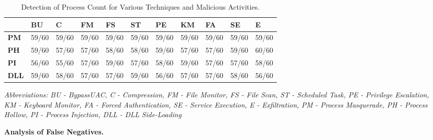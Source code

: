 \begin{table}[h!]
    \centering
    \begin{tabularx}{\textwidth}{|X|X|X|X|X|X|X|X|X|X|X|}
        \hline
        & \textbf{BU} & \textbf{C} & \textbf{FM} & \textbf{FS} & \textbf{ST} & \textbf{PE} & \textbf{KM} & \textbf{FA} & \textbf{SE} & \textbf{E} \\
        \hline
\multicolumn{1}{|l|}{\textbf{PM}} & \multicolumn{1}{l|}{59/60}   & \multicolumn{1}{l|}{59/60}  & \multicolumn{1}{l|}{59/60}   & \multicolumn{1}{l|}{59/60}   & \multicolumn{1}{l|}{59/60}   & \multicolumn{1}{l|}{59/60}   & \multicolumn{1}{l|}{59/60}   & \multicolumn{1}{l|}{59/60}   & \multicolumn{1}{l|}{59/60}   & \multicolumn{1}{l|}{59/60}  \\ \hline
\multicolumn{1}{|l|}{\textbf{PH}} & \multicolumn{1}{l|}{59/60}   & \multicolumn{1}{l|}{57/60}  & \multicolumn{1}{l|}{57/60}   & \multicolumn{1}{l|}{58/60}   & \multicolumn{1}{l|}{58/60}   & \multicolumn{1}{l|}{59/60}   & \multicolumn{1}{l|}{57/60}   & \multicolumn{1}{l|}{57/60}   & \multicolumn{1}{l|}{59/60}   & \multicolumn{1}{l|}{60/60}  \\ \hline
\multicolumn{1}{|l|}{\textbf{PI}} & \multicolumn{1}{l|}{56/60}   & \multicolumn{1}{l|}{55/60}  & \multicolumn{1}{l|}{57/60}   & \multicolumn{1}{l|}{59/60}   & \multicolumn{1}{l|}{57/60}   & \multicolumn{1}{l|}{58/60}   & \multicolumn{1}{l|}{59/60}   & \multicolumn{1}{l|}{57/60}   & \multicolumn{1}{l|}{57/60}   & \multicolumn{1}{l|}{58/60}  \\ \hline
\textbf{DLL}                      & 59/60                        & 58/60                       & 57/60                        & 57/60                        & 59/60                        & 56/60                        & 57/60                        & 57/60                        & 58/60                        & 56/60                       \\ 
        \hline
    \end{tabularx}
    \caption{Detection of Process Count for Various Techniques and Malicious Activities.}
    \smallskip
    \small \textit{Abbreviations: BU - BypassUAC, C - Compression, FM - File Monitor, FS - File Scan, ST - Scheduled Task, PE - Privilege Escalation, KM - Keyboard Monitor, FA - Forced Authentication, SE - Service Execution, E - Exfiltration, PM - Process Masquerade, PH - Process Hollow, PI - Process Injection, DLL - DLL Side-Loading}
    \label{table:eva-attack}
\end{table}
\smallskip
\noindent
{\bf Analysis of False Negatives.}
